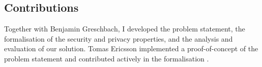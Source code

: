 \subsection{Contributions}
    \label{subsection:contributions-dss}
Together with Benjamin Greschbach, I developed the problem statement, the formalisation 
of the security and privacy properties, and the analysis and evaluation of our solution. 
Tomas Ericsson implemented a proof-of-concept of the problem statement and contributed 
actively in the formalisation \cite{Ericsson15}.


